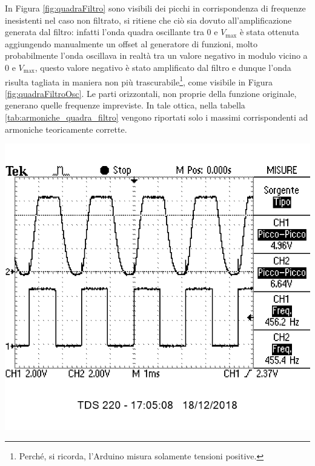 \documentclass[10pt,oneside,a4paper]{article}
\newenvironment{Figure}
  {\par\medskip\noindent\minipage{\linewidth}}
  {\endminipage\par\medskip}
\begin{document}
\begin{multicols}{2}
In Figura \ref{fig:quadraFiltro} sono visibili dei picchi in corrispondenza di frequenze inesistenti nel caso non filtrato, si ritiene che ciò sia dovuto all'amplificazione generata dal filtro: infatti l'onda quadra oscillante tra $0$ e $V_\text{max}$ è stata ottenuta aggiungendo manualmente un offset al generatore di funzioni, molto probabilmente l'onda oscillava in realtà tra un valore negativo in modulo vicino a $0$ e $V_\text{max}$, questo valore negativo è stato amplificato dal filtro e dunque l'onda risulta tagliata in maniera non più trascurabile\footnote{Perché, si ricorda, l'Arduino misura solamente tensioni positive.}, come visibile in Figura \ref{fig:quadraFiltroOsc}. Le parti orizzontali, non proprie della funzione originale, generano quelle frequenze impreviste. In tale ottica, nella tabella \ref{tab:armoniche_quadra_filtro} vengono riportati solo i massimi corrispondenti ad armoniche teoricamente corrette.

\begin{Figure}
	\begin{center}
	\includegraphics[width=0.8\linewidth]{quadraFiltroOsc}
	\label{fig:quadraFiltroOsc}
	\end{center}
\end{Figure}


\end{multicols}
\end{document}
